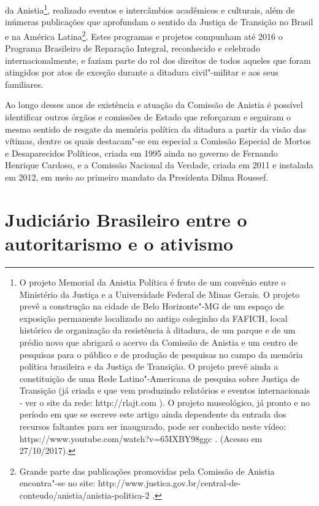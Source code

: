 da Anistia\footnote{O projeto Memorial da Anistia Política é fruto de um
  convênio entre o Ministério da Justiça e a Universidade Federal de
  Minas Gerais. O projeto prevê a construção na cidade de Belo
  Horizonte"-MG de um espaço de exposição permanente localizado no antigo
  coleginho da FAFICH, local histórico de organização da resistência à
  ditadura, de um parque e de um prédio novo que abrigará o acervo da
  Comissão de Anistia e um centro de pesquisas para o público e de
  produção de pesquisas no campo da memória política brasileira e da
  Justiça de Transição. O projeto prevê ainda a constituição de uma Rede
  Latino"-Americana de pesquisa sobre Justiça de Transição (já criada e
  que vem produzindo relatórios e eventos internacionais - ver o site da
  rede: http://rlajt.com ). O projeto museológico, já pronto e no
  período em que se escreve este artigo ainda dependente da entrada dos
  recursos faltantes para ser inaugurado, pode ser conhecido neste
  vídeo: https://www.youtube.com/watch?v=65IXBY98ggc . (Acesso em
  27/10/2017).}, realizado eventos e intercâmbios acadêmicos e
culturais, além de inúmeras publicações que aprofundam o sentido da
Justiça de Transição no Brasil e na América Latina\footnote{Grande parte
  das publicações promovidas pela Comissão de Anistia encontra"-se no
  site:
  http://www.justica.gov.br/central-de-conteudo/anistia/anistia-politica-2
  .}. Estes programas e projetos compunham até 2016 o Programa
Brasileiro de Reparação Integral, reconhecido e celebrado
internacionalmente, e faziam parte do rol dos direitos de todos aqueles
que foram atingidos por atos de exceção durante a ditadura civil"-militar
e aos seus familiares.

Ao longo desses anos de existência e atuação da Comissão de Anistia é
possível identificar outros órgãos e comissões de Estado que reforçaram
e seguiram o mesmo sentido de resgate da memória política da ditadura a
partir da visão das vítimas, dentre os quais destacam"-se em especial a
Comissão Especial de Mortos e Desaparecidos Políticos, criada em 1995
ainda no governo de Fernando Henrique Cardoso, e a Comissão Nacional da
Verdade, criada em 2011 e instalada em 2012, em meio ao primeiro mandato
da Presidenta Dilma Roussef.

\section{Judiciário Brasileiro entre o autoritarismo e o ativismo}


